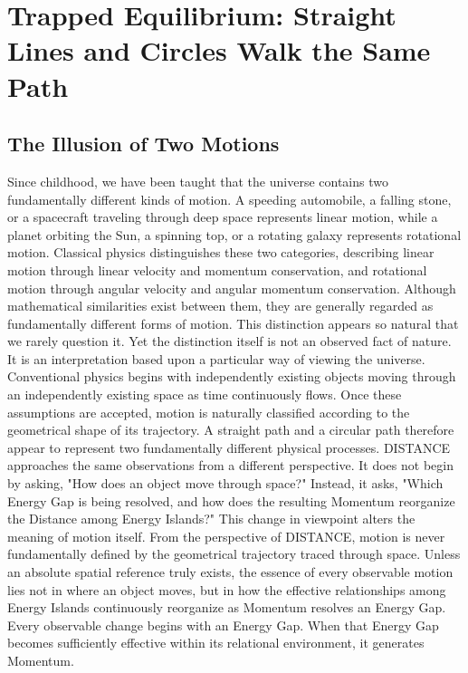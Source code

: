\section{Trapped Equilibrium: Straight Lines and Circles Walk
the Same Path}

\subsection*{\textbf{The Illusion of Two Motions}}

Since childhood, we have been taught that the universe contains two fundamentally different kinds of motion. A speeding automobile, a falling stone, or a spacecraft traveling through deep space represents linear motion, while a planet orbiting the Sun, a spinning top, or a rotating galaxy represents rotational motion. Classical physics distinguishes these two categories, describing linear motion through linear velocity and momentum conservation, and rotational motion through angular velocity and angular momentum conservation. Although mathematical similarities exist between them, they are generally regarded as fundamentally different forms of motion.
This distinction appears so natural that we rarely question it. Yet the distinction itself is not an observed fact of nature. It is an interpretation based upon a particular way of viewing the universe.
Conventional physics begins with independently existing objects moving through an independently existing space as time continuously flows. Once these assumptions are accepted, motion is naturally classified according to the geometrical shape of its trajectory. A straight path and a circular path therefore appear to represent two fundamentally different physical processes.
DISTANCE approaches the same observations from a different perspective.
It does not begin by asking,
"How does an object move through space?"
Instead, it asks,
"Which Energy Gap is being resolved, and how does the resulting Momentum reorganize the Distance among Energy Islands?"
This change in viewpoint alters the meaning of motion itself.
From the perspective of DISTANCE, motion is never fundamentally defined by the geometrical trajectory traced through space. Unless an absolute spatial reference truly exists, the essence of every observable motion lies not in where an object moves, but in how the effective relationships among Energy Islands continuously reorganize as Momentum resolves an Energy Gap.
Every observable change begins with an Energy Gap.
When that Energy Gap becomes sufficiently effective within its relational environment, it generates Momentum.
